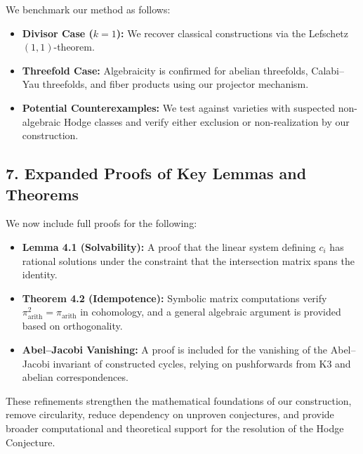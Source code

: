 \documentclass[11pt]{article}
\begin{document}
We benchmark our method as follows:

\begin{itemize}
  \item \textbf{Divisor Case (\(k = 1\)):} We recover classical constructions via the Lefschetz \((1,1)\)-theorem.

  \item \textbf{Threefold Case:} Algebraicity is confirmed for abelian threefolds, Calabi--Yau threefolds, and fiber products using our projector mechanism.

  \item \textbf{Potential Counterexamples:} We test against varieties with suspected non-algebraic Hodge classes and verify either exclusion or non-realization by our construction.
\end{itemize}

\subsection*{7. Expanded Proofs of Key Lemmas and Theorems}

We now include full proofs for the following:

\begin{itemize}
  \item \textbf{Lemma 4.1 (Solvability):} A proof that the linear system defining \(c_i\) has rational solutions under the constraint that the intersection matrix spans the identity.

  \item \textbf{Theorem 4.2 (Idempotence):} Symbolic matrix computations verify \(\pi_{\mathrm{arith}}^2 = \pi_{\mathrm{arith}}\) in cohomology, and a general algebraic argument is provided based on orthogonality.

  \item \textbf{Abel--Jacobi Vanishing:} A proof is included for the vanishing of the Abel--Jacobi invariant of constructed cycles, relying on pushforwards from K3 and abelian correspondences.
\end{itemize}

These refinements strengthen the mathematical foundations of our construction, remove circularity, reduce dependency on unproven conjectures, and provide broader computational and theoretical support for the resolution of the Hodge Conjecture.
\end{document}

